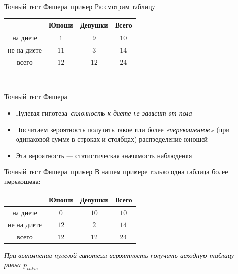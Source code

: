 \documentclass[10pt,pdf,utf8,russian,aspectratio=169]{beamer}
\begin{document}
\begin{frame}{Точный тест Фишера: пример}
    Рассмотрим таблицу
    \begin{table}[!ht]
        \centering
        \begin{tabular}{c|c|c|c}
                 & Юноши   & Девушки &  Всего \\ \hline
        на диете & $1$     & $9$     & $10$ \\ \hline
     не на диете & $11$     & $3$     & $14$ \\ \hline
           всего & $12$ & $12$ & $24$ \\
        \end{tabular}
    \end{table}
     \\
\end{frame}

\begin{frame}{Точный тест Фишера}
  \begin{itemize}[<+->]
    \item Нулевая гипотеза: \emph{склонность к диете не зависит от пола}
    \item Посчитаем вероятность получить такое или более \emph{«перекошенное»} (при одинаковой сумме в строках и столбцах) распределение юношей
    \item Эта вероятность --- статистическая значимость наблюдения
  \end{itemize}
\end{frame}

\begin{frame}{Точный тест Фишера: пример}
    В нашем примере только одна таблица более перекошена:
    \begin{table}[!ht]
        \centering
        \begin{tabular}{c|c|c|c}
                 & Юноши   & Девушки &  Всего \\ \hline
        на диете & $0$     & $10$     & $10$ \\ \hline
     не на диете & $12$     & $2$     & $14$ \\ \hline
           всего & $12$ & $12$ & $24$ \\
        \end{tabular}
    \end{table}
    \emph{
        При выполнении нулевой гипотезы вероятность получить исходную таблицу равна $p_{value}$
    }
\end{frame}
\end{document}
